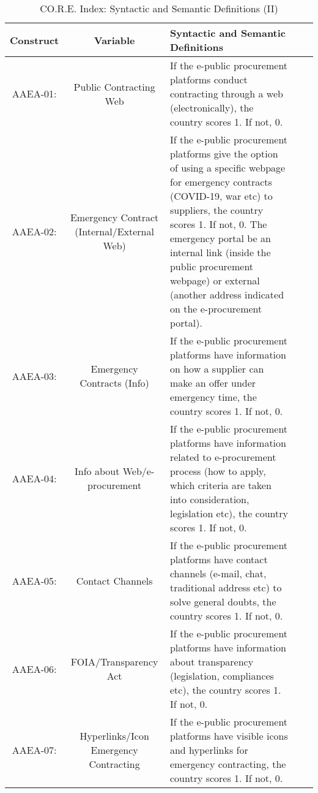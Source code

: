 \documentclass[a4paper, twoside]{report}
\begin{document}
\begin{table}[htbp]
  \centering
  \caption{CO.R.E. Index: Syntactic and Semantic Definitions (II)}
   \tabcolsep=0.80cm
	\renewcommand{\arraystretch}{2.3}
	\begin{adjustbox}{max width=\linewidth}
       \begin{tabular}{ccp{30em}p{30em}p{21.335em}}
    \toprule
    Construct & Variable & Syntactic and Semantic Definitions \\
    \midrule
    AAEA-01: & Public Contracting Web & If the e-public procurement platforms conduct contracting through a web (electronically), the country scores 1. If not, 0. \\
    AAEA-02: & \cellcolor[rgb]{ .749,  .749,  .749}Emergency Contract (Internal/External Web) & \cellcolor[rgb]{ .749,  .749,  .749}If the e-public procurement platforms give the option of using a specific webpage for emergency contracts (COVID-19, war etc) to suppliers, the country scores 1. If not, 0. The emergency portal be an internal link (inside the public procurement webpage) or external (another address indicated on the e-procurement portal).  \\
    AAEA-03: & \cellcolor[rgb]{ .749,  .749,  .749}Emergency Contracts (Info) & \cellcolor[rgb]{ .749,  .749,  .749}If the e-public procurement platforms have information on how a supplier can make an offer under emergency time, the country scores 1. If not, 0. \\
    AAEA-04: & Info about Web/e-procurement & If the e-public procurement platforms have information related to e-procurement process (how to apply, which criteria are taken into consideration, legislation etc), the country scores 1. If not, 0. \\
    AAEA-05: & Contact Channels & If the e-public procurement platforms have contact channels (e-mail, chat, traditional address etc) to solve general doubts, the country scores 1. If not, 0. \\
    AAEA-06: & FOIA/Transparency Act & If the e-public procurement platforms have information about transparency (legislation, compliances etc), the country scores 1. If not, 0. \\
    AAEA-07: & \cellcolor[rgb]{ .749,  .749,  .749}Hyperlinks/Icon Emergency Contracting & \cellcolor[rgb]{ .749,  .749,  .749}If the e-public procurement platforms have visible icons and hyperlinks for emergency contracting, the country scores 1. If not, 0. \\

\end{tabular}
\end{adjustbox}
\end{table}
\end{document}

